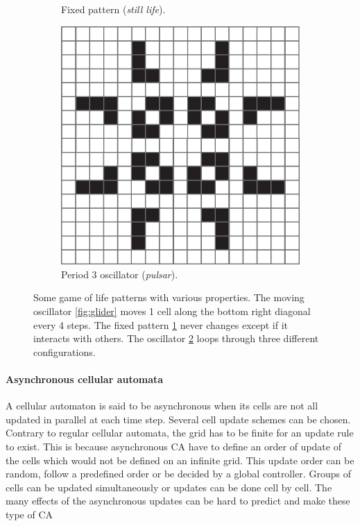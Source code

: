 \begin{figure}[htbp]
\begin{subfigure}[t]{.31\linewidth}
    \caption{Fixed pattern (\emph{still life}).}
    \label{fig:still_life}
  \end{subfigure}
  \begin{subfigure}[t]{.31\linewidth}
    \centering
    \includegraphics[width=\linewidth]{figures/pulsar.pdf}
    \caption{Period 3 oscillator (\emph{pulsar}).}
    \label{fig:pulsar}
  \end{subfigure}

  \caption{Some game of life patterns with various properties. The moving
    oscillator \ref{fig:glider} moves 1 cell along the bottom right diagonal
    every 4 steps. The fixed pattern \ref{fig:still_life} never changes except
    if it interacts with others. The oscillator \ref{fig:pulsar} loops through
    three different configurations.}
  \label{fig:gol_patterns}
\end{figure}


\paragraph{Asynchronous cellular automata}
A cellular automaton is said to be asynchronous when its cells are not all
updated in parallel at each time step. Several cell update schemes can
be chosen. Contrary to regular cellular automata, the grid has to be finite
for an update rule to exist. This is because asynchronous \ac{CA} have to define
an order of update of the cells which would not be defined on an infinite grid.
This update order can be random, follow a predefined order or be decided by a
global controller. Groups of cells can be updated simultaneously or updates can
be done cell by cell. The many effects of the asynchronous updates can be hard
to predict and make these type of \ac{CA}

